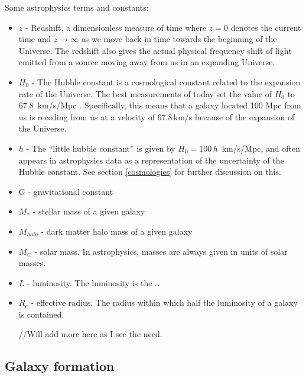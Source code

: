 Some astrophysics terms and constants:

\begin{itemize}
    \item $z$ - Redshift, a dimensionless measure of time where $z=0$ denotes the current time and $z \rightarrow \infty$ as we move back in time towards the beginning of the Universe. The redshift also gives the actual physical frequency shift of light emitted from a source moving away from us in an expanding Universe.
    \item $H_{0}$ - The Hubble constant is a cosmological constant related to the expansion rate of the Universe. The best measurements of today set the value of $H_0$ to $67.8\, $ km/s/Mpc \parencite{Planck2015}. Specifically, this means that a galaxy located 100 Mpc from us is receding from us at a velocity of $67.8\,$km/s because of the expansion of the Universe.
    \item $h$ - The ``little hubble constant'' is given by $H_0 = 100\,h\,$ km/s/Mpc, and often appears in astrophysics data as a representation of the uncertainty of the Hubble constant. See section \ref{cosmologies} for further discussion on this.
    \item G - gravitational constant
    \item $M_{*}$ - stellar mass of a given galaxy
    \item $M_{halo}$ - dark matter halo mass of a given galaxy
    \item $M_{\odot}$ - solar mass. In astrophysics, masses are always given in units of solar masses.
    \item $L$ - luminosity. The luminosity is the ..
    \item $R_e$ - effective radius. The radius within which half the luminosity of a galaxy is contained.

//Will add more here as I see the need.

\end{itemize}

\subsection{Galaxy formation}

